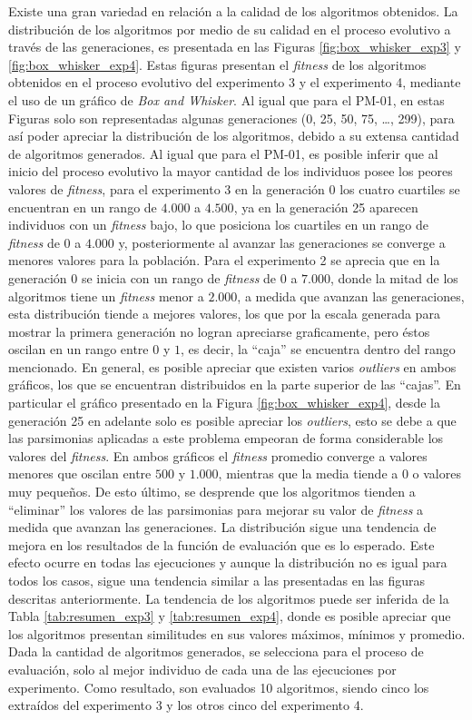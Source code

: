 Existe una gran variedad en relación a la calidad de los algoritmos obtenidos. La distribución de los algoritmos por medio de su calidad en el proceso evolutivo a través de las generaciones, es presentada en las Figuras \ref{fig:box_whisker_exp3} y \ref{fig:box_whisker_exp4}. Estas figuras presentan el \textit{fitness} de los algoritmos obtenidos en el proceso evolutivo del experimento 3 y el experimento 4, mediante el uso de un gráfico de \textit{Box and Whisker}. Al igual que para el PM-01, en estas Figuras solo son representadas algunas generaciones (0, 25, 50, 75, …, 299), para así poder apreciar la distribución de los algoritmos, debido a su extensa cantidad de algoritmos generados. Al igual que para el PM-01, es posible inferir que al inicio del proceso evolutivo la mayor cantidad de los individuos posee los peores valores de \textit{fitness}, para el experimento 3 en la generación 0 los cuatro cuartiles se encuentran en un rango de $4.000$ a $4.500$, ya en la generación 25 aparecen individuos con un \textit{fitness} bajo, lo que posiciona los cuartiles en un rango de \textit{fitness} de $0$ a $4.000$ y, posteriormente al avanzar las generaciones se converge a menores valores para la población. Para el experimento 2 se aprecia que en la generación 0 se inicia con un rango de \textit{fitness} de $0$ a $7.000$, donde la mitad de los algoritmos tiene un \textit{fitness} menor a $2.000$, a medida que avanzan las generaciones, esta distribución tiende a mejores valores, los que por la escala generada para mostrar la primera generación no logran apreciarse graficamente, pero éstos oscilan en un rango entre $0$ y $1$, es decir, la “caja” se encuentra dentro del rango mencionado. En general, es posible apreciar que existen varios \textit{outliers} en ambos gráficos, los que se encuentran distribuidos en la parte superior de las “cajas”. En particular el gráfico presentado en la Figura \ref{fig:box_whisker_exp4}, desde la generación 25 en adelante solo es posible apreciar los \textit{outliers}, esto se debe a que las parsimonias aplicadas a este problema empeoran de forma considerable los valores del \textit{fitness}. En ambos gráficos el \textit{fitness} promedio converge a valores menores que oscilan entre $500$ y $1.000$, mientras que la media tiende a $0$ o valores muy pequeños. De esto último, se desprende que los algoritmos tienden a “eliminar” los valores de las parsimonias para mejorar su valor de \textit{fitness} a medida que avanzan las generaciones. La distribución sigue una tendencia de mejora en los resultados de la función de evaluación que es lo esperado. Este efecto ocurre en todas las ejecuciones y aunque la distribución no es igual para todos los casos, sigue una tendencia similar a las presentadas en las figuras descritas anteriormente. La tendencia de los algoritmos puede ser inferida de la Tabla \ref{tab:resumen_exp3} y \ref{tab:resumen_exp4}, donde es posible apreciar que los algoritmos presentan similitudes en sus valores máximos, mínimos y promedio. Dada la cantidad de algoritmos generados, se selecciona para el proceso de evaluación, solo al mejor individuo de cada una de las ejecuciones por experimento. Como resultado, son evaluados 10 algoritmos, siendo cinco los extraídos del experimento 3 y los otros cinco del experimento 4. 

